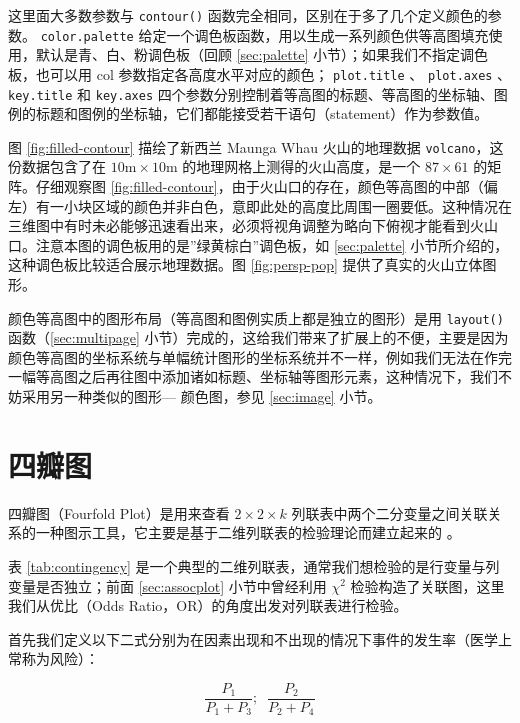 \documentclass[
  b5paper,
  UTF8,twoside]{book}
\begin{document}
这里面大多数参数与 \texttt{contour()} 函数完全相同，区别在于多了几个定义颜色的参数。 \texttt{color.palette} 给定一个调色板函数，用以生成一系列颜色供等高图填充使用，默认是青、白、粉调色板（回顾 \ref{sec:palette} 小节）；如果我们不指定调色板，也可以用 col 参数指定各高度水平对应的颜色； \texttt{plot.title} 、 \texttt{plot.axes} 、 \texttt{key.title} 和 \texttt{key.axes} 四个参数分别控制着等高图的标题、等高图的坐标轴、图例的标题和图例的坐标轴，它们都能接受若干语句（statement）作为参数值。

图 \ref{fig:filled-contour}
描绘了新西兰 Maunga Whau 火山的地理数据 \texttt{volcano}，这份数据包含了在 \(10\mathrm{m}\times10\mathrm{m}\) 的地理网格上测得的火山高度，是一个 \(87\times61\) 的矩阵。仔细观察图 \ref{fig:filled-contour}，由于火山口的存在，颜色等高图的中部（偏左）有一小块区域的颜色并非白色，意即此处的高度比周围一圈要低。这种情况在三维图中有时未必能够迅速看出来，必须将视角调整为略向下俯视才能看到火山口。注意本图的调色板用的是''绿黄棕白''调色板，如 \ref{sec:palette} 小节所介绍的，这种调色板比较适合展示地理数据。图 \ref{fig:persp-pop}
提供了真实的火山立体图形。

颜色等高图中的图形布局（等高图和图例实质上都是独立的图形）是用 \texttt{layout()} 函数（\ref{sec:multipage} 小节）完成的，这给我们带来了扩展上的不便，主要是因为颜色等高图的坐标系统与单幅统计图形的坐标系统并不一样，例如我们无法在作完一幅等高图之后再往图中添加诸如标题、坐标轴等图形元素，这种情况下，我们不妨采用另一种类似的图形--- 颜色图，参见 \ref{sec:image} 小节。

\hypertarget{sec:fourfoldplot}{%
\section{四瓣图}\label{sec:fourfoldplot}}

四瓣图（Fourfold Plot）是用来查看 \(2\times2\times k\) 列联表中两个二分变量之间关联关系的一种图示工具，它主要是基于二维列联表的检验理论而建立起来的 \citep{Friendly94}。

表 \ref{tab:contingency} 是一个典型的二维列联表，通常我们想检验的是行变量与列变量是否独立；前面 \ref{sec:assocplot} 小节中曾经利用 \(\chi^{2}\) 检验构造了关联图，这里我们从优比（Odds Ratio，OR）的角度出发对列联表进行检验。

首先我们定义以下二式分别为在因素出现和不出现的情况下事件的发生率（医学上常称为风险）：

\begin{equation} 
\frac{P_{1}}{P_{1}+P_{3}};\;\;\frac{P_{2}}{P_{2}+P_{4}}
\label{eq:OR1}
\end{equation}
\end{document}
